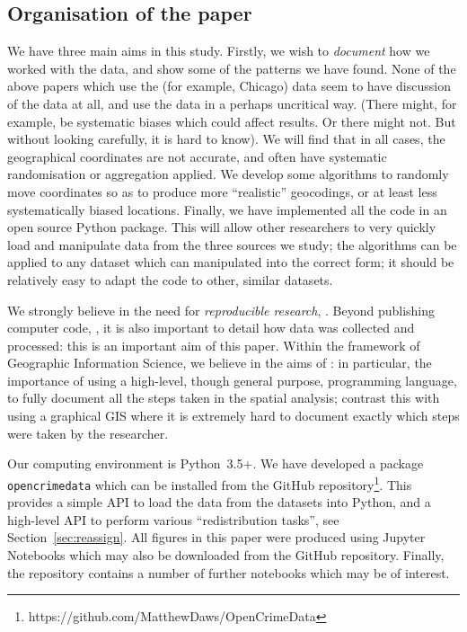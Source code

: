\documentclass[twoside,a4paper,twocolumn,10pt]{article}
\theoremstyle{plain}
\theoremstyle{definition}
\begin{document}
\subsection{Organisation of the paper}

We have three main aims in this study.  Firstly, we wish to \emph{document} how we worked
with the data, and show some of the patterns we have found.  None of the above papers
which use the (for example, Chicago) data seem
to have discussion of the data at all, and use the data in a perhaps uncritical way.
(There might, for example, be systematic biases which could affect results.  Or there might not.
But without looking carefully, it is hard to know).  We will find that in all cases, the
geographical coordinates are not accurate, and often have systematic randomisation or aggregation
applied.  We develop some algorithms to randomly move coordinates so as to produce more
``realistic'' geocodings, or at least less systematically biased locations.  Finally, we
have implemented all the code in an open source Python package.  This will allow other researchers
to very quickly load and manipulate data from the three sources we study; the algorithms can
be applied to any dataset which can manipulated into the correct form; it should be relatively
easy to adapt the code to other, similar datasets.

We strongly believe in the need for \emph{reproducible research}, \cite{hl, morin}.
Beyond publishing computer code, \cite{barnes}, it is also important to detail how data was collected
and processed: this is an important aim of this paper.  Within the framework of
Geographic Information Science, we believe in the aims of \cite{ssb}: in particular, the
importance of using a high-level, though general purpose, programming language, to fully
document all the steps taken in the spatial analysis; contrast this with using a graphical
GIS where it is extremely hard to document exactly which steps were taken by the researcher.

Our computing environment is Python~3.5+.  We have developed a package \texttt{opencrimedata}
which can be installed from the GitHub
repository\footnote{https://github.com/MatthewDaws/OpenCrimeData}.
This provides a simple API to load the data from the datasets into Python, and a high-level
API to perform various ``redistribution tasks'', see Section~\ref{sec:reassign}.
All figures in this paper were produced using Jupyter Notebooks which may also be downloaded from
the GitHub repository.  Finally, the repository contains a number of further notebooks which may
be of interest.
\end{document}
